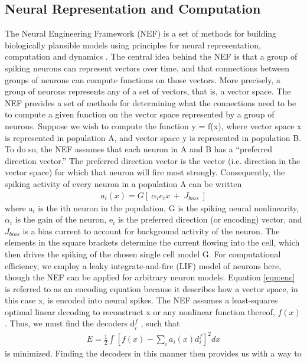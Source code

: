 \documentclass[10pt,letterpaper]{article}
\begin{document}
\subsection{Neural Representation and Computation}
The Neural Engineering Framework (NEF) is a set of methods for building biologically
plausible models using principles for neural representation, computation and dynamics \citep{Eliasmith2003m}. 
The central idea behind the NEF is that a group of spiking neurons can represent
vectors over time, and that connections between groups of neurons can compute functions on those vectors. More precisely, a group of neurons represents any of a set of
vectors, that is, a vector space. The NEF provides a set of methods for determining
what the connections need to be to compute a given function on the vector space represented by a group of neurons.
Suppose we wish to compute the function y = f(x), where vector space x is represented in population A, and vector space y is represented in population B. To do so,
the NEF assumes that each neuron in A and B has a ``preferred direction vector.'' The
preferred direction vector is the vector (i.e. direction in the vector space) for which
that neuron will fire most strongly. Consequently, the spiking activity of every neuron in a population A can be written
\begin{align}
a_i (x) = G [\ \alpha_i e_i x\ +\ J_{bias}\ ]\label{eqn:enc}
\end{align}
where a$_i$ is the ith neuron in the population, G is the spiking neural nonlinearity, $\alpha_i$
is the gain of the neuron, e$_i$ is the preferred direction (or encoding) vector, and $J_{bias}$
is a bias current to account for background activity of the neuron. The elements in
the square brackets determine the current flowing into the cell, which then drives the
spiking of the chosen single cell model G. For computational efficiency, we employ
a leaky integrate-and-fire (LIF) model of neurons here, though the NEF can be applied for arbitrary neuron models. Equation \eqref{eqn:enc} is
referred to as an encoding equation because it describes how a vector space, in this case
x, is encoded into neural spikes. The NEF assumes a least-squares optimal linear decoding to 
reconstruct x or any nonlinear function thereof, $f(x)$. Thus, we must find the
decoders d$^f_i$ , such that
\begin{align}
E = \frac{1}{2}\int[f(x) - \sum_i a_i(x) d^f_i]^2dx\label{eqn:error}
\end{align}
is minimized. Finding the decoders in this manner then provides us with a way to
\end{document}
